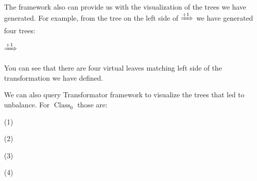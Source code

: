 \documentclass[final]{article}
\theoremstyle{definition}
\theoremstyle{definition}
\theoremstyle{remark}
\DeclareMathOperator{\tClass}{\text{Class}}
\newcommand{\includeinlinesvg}[2]{\begin{minipage}{#1\textwidth}\end{minipage}}
\newcommand{\includeinlinescaledsvg}[3]{\begin{minipage}{#1\textwidth}\begin{center}\end{center}\end{minipage}}
\begin{document}
The framework also can provide us with the visualization of the trees we have generated. For example, from the tree on the left side of \(\xRightarrow{+1}\) we have generated four trees:

\includeinlinesvg{.19}{lambda__trees_00__4_base}%
\(\xRightarrow{+1}\)%
\includeinlinesvg{.19}{lambda__trees_00__4}%
\includeinlinesvg{.19}{lambda__trees_00__5}%
\includeinlinesvg{.19}{lambda__trees_00__6}%
\includeinlinesvg{.19}{lambda__trees_00__7}%

You can see that there are four virtual leaves matching left side of the transformation we have defined.

We can also query Transformator framework to visualize the trees that led to unbalance. For \(\tClass_0\) those are:

(1)%
\begin{minipage}{.98\textwidth}\begin{center}%
\includeinlinescaledsvg{.33}{.4}{lambda__trees_00__2}%
\includeinlinescaledsvg{.33}{.4}{lambda__trees_00__3}%
\includeinlinescaledsvg{.33}{.4}{lambda__trees_00__7}%
\end{center}\end{minipage}

(2)%
\begin{minipage}{.98\textwidth}\begin{center}%
\includeinlinescaledsvg{.33}{.4}{lambda__trees_00__4}%
\includeinlinescaledsvg{.33}{.4}{lambda__trees_00__12}%
\includeinlinescaledsvg{.33}{.4}{lambda__trees_00__13}%
\end{center}\end{minipage}

(3)%
\begin{minipage}{.98\textwidth}\begin{center}%
\includeinlinescaledsvg{.16}{.4}{lambda__trees_00__0}%
\includeinlinescaledsvg{.16}{.4}{lambda__trees_00__1}%
\includeinlinescaledsvg{.16}{.4}{lambda__trees_00__5}%
\includeinlinescaledsvg{.16}{.4}{lambda__trees_00__6}%
\includeinlinescaledsvg{.16}{.4}{lambda__trees_00__14}%
\includeinlinescaledsvg{.16}{.4}{lambda__trees_00__15}%
\end{center}\end{minipage}

(4)%
\begin{minipage}{.98\textwidth}\begin{center}%
\includeinlinescaledsvg{.25}{.4}{lambda__trees_00__8}%
\includeinlinescaledsvg{.25}{.4}{lambda__trees_00__9}%
\includeinlinescaledsvg{.25}{.4}{lambda__trees_00__10}%
\includeinlinescaledsvg{.25}{.4}{lambda__trees_00__11}%
\end{center}\end{minipage}
\end{document}
